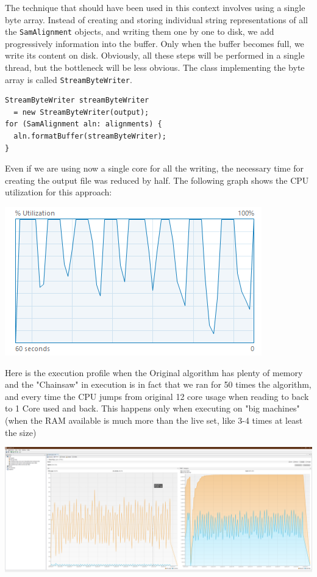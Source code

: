\documentclass[a4paper,twoside]{article}
\begin{document}
The technique that should have been used in this context involves using a single byte array.
Instead of creating and storing individual string representations of all the {\tt SamAlignment} objects, and writing them one by one to disk, we add progressively information into the buffer. Only when the buffer becomes full, we write its content on disk. Obviously, all these steps will be performed in a single thread, but the bottleneck will be less obvious. The class implementing the byte array is called {\tt StreamByteWriter}.
\begin{verbatim}
StreamByteWriter streamByteWriter 
  = new StreamByteWriter(output);
for (SamAlignment aln: alignments) {
  aln.formatBuffer(streamByteWriter);
}
\end{verbatim}
Even if we are using now a single core for all the writing, the necessary time for creating the output file was reduced by half. The following graph shows the CPU utilization for this approach:
\begin{center}
\includegraphics[scale=0.5]{images/cpu_optimized.png}
\end{center}

Here is the execution profile when the Original algorithm has plenty of memory and the "Chainsaw" in execution is in fact that we ran for 50 times the algorithm, and every time the CPU jumps from original 12 core usage when reading to back to 1 Core used and back. This happens only when executing on "big machines" (when the RAM available is much more than the live set, like 3-4 times at least the size)
\begin{center}
	\includegraphics[scale=0.065]{images/Visual_VM_Small_file_Original_execution_profile.png}
\end{center}
\end{document}
